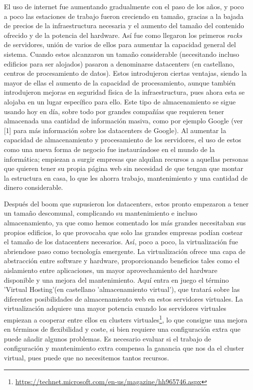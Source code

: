 \documentclass[a4paper, 10pt]{article} %
\begin{document}
El uso de internet fue aumentando gradualmente con el paso de los años, y poco a poco las estaciones de trabajo fueron creciendo en tamaño, gracias a la bajada de precios de la infraestructura necesaria y el aumento del tamaño del contenido ofrecido y de la potencia del hardware. Así fue como llegaron los primeros \textit{racks} de servidores, unión de varios de ellos para aumentar la capacidad general del sistema. Cuando estos alcanzaron un tamaño considerable (necesitando incluso edificios para ser alojados) pasaron a denominarse datacenters (en castellano, centros de procesamiento de datos). Estos introdujeron ciertas ventajas, siendo la mayor de ellas el aumento de la capacidad de procesamiento, aunque también introdujeron mejoras en seguridad física de la infraestructura, pues ahora esta se alojaba en un lugar específico para ello. Este tipo de almacenamiento se sigue usando hoy en día, sobre todo por grandes compañías que requieren tener almacenada una cantidad de información masiva, como por ejemplo Google (ver [1] para más información sobre los datacenters de Google). Al aumentar la capacidad de almacenamiento y procesamiento de los servidores, el uso de estos como una nueva forma de negocio fue instaurándose en el mundo de la informática; empiezan a surgir empresas que alquilan recursos a aquellas personas que quieren tener su propia página web sin necesidad de que tengan que montar la estructura en casa, lo que les ahorra trabajo, mantenimiento y una cantidad de dinero considerable. 

Después del boom que supusieron los datacenters, estos pronto empezaron a tener un tamaño descomunal, complicando su mantenimiento e incluso almacenamiento, ya que como hemos comentado los más grandes necesitaban sus propios edificios, lo que provocaba que solo las grandes empresas podían costear el tamaño de los datacenters necesarios. Así, poco a poco, la virtualización fue abriendose paso como tecnología emergente. La virtualización ofrece una capa de abstracción entre software y hardware, proporcionando beneficios tales como el aislamiento entre aplicaciones, un mayor aprovechamiento del hardware disponible y una mejora del mantenimiento. Aquí entra en juego el término 'Virtual Hosting'(en castellano 'almacenamiento virtual'), que tratará sobre las diferentes posibilidades de almacenamiento web en estos servidores virtuales. La virtualización adquiere una mayor potencia cuando los servidores virtuales empiezan a cooperar entre ellos en clusters virtuales\footnote{\url{https://technet.microsoft.com/en-us/magazine/hh965746.aspx}}, lo que consigue una mejora en términos de flexibilidad y coste, si bien requiere una configuración extra que puede añadir algunos problemas. Es necesario evaluar si el trabajo de configuración y mantenimiento extra compensa la ganancia que nos da el cluster virtual, pues puede que no necesitemos tantos recursos. 
\end{document}
